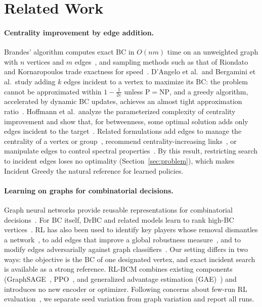 \documentclass[runningheads]{llncs}
\newcommand{\rlbcm}{RL-BCM}
\begin{document}
\section{Related Work}
\paragraph{Centrality improvement by edge addition.}
Brandes' algorithm computes exact BC in $O(nm)$ time on an unweighted graph
with $n$ vertices and $m$ edges~\cite{Brandes2001}, and sampling methods such
as that of Riondato and Kornaropoulos trade exactness for
speed~\cite{Riondato2016}. D'Angelo et al.\ and Bergamini et al.\ study
adding $k$ edges incident to a vertex to maximize its BC: the problem
cannot be approximated within $1-\frac{1}{2e}$ unless $\mathrm{P}=\mathrm{NP}$,
and a greedy algorithm, accelerated by dynamic BC updates, achieves an
almost tight approximation ratio~\cite{DAngelo2016,Bergamini2018}. Hoffmann et al.\ analyze the
parameterized complexity of centrality improvement and show that, for
betweenness, some optimal solution adds only edges incident to the
target~\cite{Hoffmann2018}.
Related formulations add edges to manage the centrality of a vertex or
group~\cite{Ishakian2012,Medya2018}, recommend centrality-increasing
links~\cite{Parotsidis2016}, or manipulate edges to control spectral
properties~\cite{Tong2012}. By this result, restricting search to incident
edges loses no optimality (Section~\ref{sec:problem}), which makes Incident
Greedy the natural reference for learned policies.

\paragraph{Learning on graphs for combinatorial decisions.}
Graph neural networks provide reusable representations for combinatorial
decisions~\cite{Khalil2017,Cappart2023,Darvariu2024}. For BC itself, DrBC
and related models learn to rank high-BC vertices~\cite{Fan2019,Maurya2021}. RL has also been used to identify key players whose removal
dismantles a network~\cite{Fan2020}, to add edges that improve a global
robustness measure~\cite{Darvariu2021}, and to modify edges adversarially
against graph classifiers~\cite{Dai2018}. Our setting differs in two ways:
the objective is the BC of one designated vertex, and exact incident search
is available as a strong reference. \rlbcm{} combines existing components
(GraphSAGE~\cite{Hamilton2017}, PPO~\cite{Schulman2017}, and generalized
advantage estimation (GAE)~\cite{Schulman2016}) and introduces no new
encoder or optimizer. Following concerns about few-run RL
evaluation~\cite{Agarwal2021}, we separate seed variation from graph
variation and report all runs.
\end{document}
